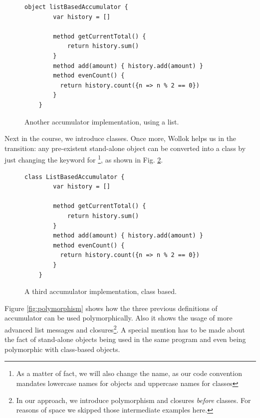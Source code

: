 \vspace{-3mm}
\begin{figure}[ht]
 \centering
 \begin{lstlisting}[language=Wollok]
	object listBasedAccumulator {
		var history = []
		
		method getCurrentTotal() {
			return history.sum()
		}
		method add(amount) { history.add(amount) }
		method evenCount() {
		  return history.count({n => n % 2 == 0})
		}
	}\end{lstlisting}
\vspace{-3mm}
 \caption{\small Another accumulator implementation, using a list.}
 \label{fig:accumulator/list}
\end{figure}

\medskip
Next in the course, we introduce classes.
Once more, Wollok helps us in the transition: any pre-existent stand-alone object can be converted into a class by just changing the keyword  for \footnote{As a matter of fact, we will also change the name, as our code convention mandates lowercase names for objects and uppercase names for classes}, as shown in Fig. \ref{fig:accumulator/classes}.

\vspace{-3mm}
\begin{figure}[ht]
 \centering
 \begin{lstlisting}[language=Wollok]
	class ListBasedAccumulator {
		var history = []
		
		method getCurrentTotal() { 
			return history.sum() 
		}
		method add(amount) { history.add(amount) }
		method evenCount() { 
		  return history.count({n => n % 2 == 0})
		}
	}\end{lstlisting}
\vspace{-3mm}
\caption{\small A third accumulator implementation, class based.}
\label{fig:accumulator/classes}
\end{figure}

\medskip
Figure \ref{fig:polymorphism} shows how the three previous definitions of accumulator can be used polymorphically. 
Also it shows the usage of more advanced list messages and closures\footnote{In our approach, we introduce polymorphism and closures \emph{before} classes. For reasons of space we skipped those intermediate examples here.}.
A special mention has to be made about the fact of stand-alone objects being used in the same program and even being polymorphic with class-based objects.

